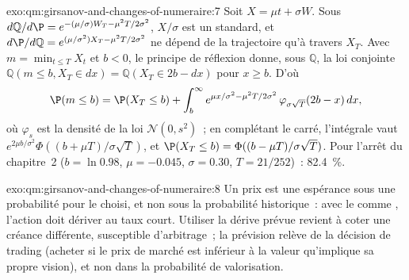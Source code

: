 \begin{solution}{exo:qm:girsanov-and-changes-of-numeraire:7}
Soit $X = \mu t + \sigma W$. Sous $d\mathbb Q/d\P = e^{-(\mu/\sigma)W_T - \mu^2T/2\sigma^2}$, $X/\sigma$ est un  standard, et $d\P/d\mathbb Q = e^{(\mu/\sigma^2)X_T - \mu^2T/2\sigma^2}$ ne dépend de la trajectoire qu'à travers $X_T$. Avec $m =
\min_{t\le T}X_t$ et $b < 0$, le principe de réflexion donne, sous $\mathbb Q$, la loi conjointe $\mathbb Q(m \le b, X_T \in dx)
= \mathbb Q(X_T \in 2b - dx)$ pour $x \ge b$. D'où
\[
\P(m \le b) = \P(X_T \le b) + \int_b^\infty e^{\mu x/\sigma^2 - \mu^2T/2\sigma^2}\,\varphi_{\sigma\sqrt T}(2b - x)\,dx,
\]
où $\varphi_s$ est la densité de la loi $\mathcal N(0, s^2)$~; en complétant le carré, l'intégrale vaut $e^{2\mu b/\sigma^2}\Phi((b +
\mu T)/\sigma\sqrt T)$, et $\P(X_T \le b) = \Phi((b - \mu T)/\sigma\sqrt T)$. Pour l'arrêt du chapitre~2 ($b = \ln
0.98$, $\mu = -0.045$, $\sigma = 0.30$, $T = 21/252$)~: 82.4~\%.
\end{solution}

\begin{solution}{exo:qm:girsanov-and-changes-of-numeraire:8}
Un prix est une espérance sous une probabilité  pour le  choisi, et non sous la
probabilité historique~: avec le  comme , l'action doit dériver au taux
court. Utiliser la dérive prévue revient à coter une créance différente, susceptible d'arbitrage~; la prévision relève de la
décision de trading (acheter si le prix de marché est inférieur à la valeur qu'implique sa propre vision), et non dans la
probabilité de valorisation.
\end{solution}

